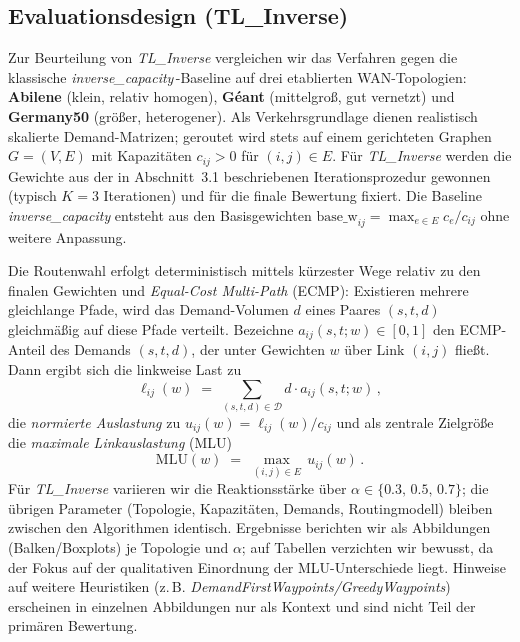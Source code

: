 \documentclass[sigconf,nonacm,review]{acmart}
\begin{document}
\subsection{Evaluationsdesign (TL\_Inverse)}
Zur Beurteilung von \textit{TL\_Inverse} vergleichen wir das Verfahren gegen die klassische
\emph{inverse\_capacity}\,-Baseline auf drei etablierten WAN-Topologien:
\textbf{Abilene} (klein, relativ homogen), \textbf{Géant} (mittelgroß, gut vernetzt) und
\textbf{Germany50} (größer, heterogener). Als Verkehrsgrundlage dienen realistisch skalierte
Demand-Matrizen; geroutet wird stets auf einem gerichteten Graphen $G=(V,E)$ mit Kapazitäten
$c_{ij}>0$ für $(i,j)\in E$. Für \textit{TL\_Inverse} werden die Gewichte aus der in
Abschnitt~3.1 beschriebenen Iterationsprozedur gewonnen (typisch $K=3$ Iterationen) und für
die finale Bewertung fixiert. Die Baseline \emph{inverse\_capacity} entsteht aus den
Basisgewichten $\mathrm{base\_w}_{ij}=\max_{e\in E}c_e/c_{ij}$ ohne weitere Anpassung.

Die Routenwahl erfolgt deterministisch mittels kürzester Wege relativ zu den finalen Gewichten
und \emph{Equal-Cost Multi-Path} (ECMP): Existieren mehrere gleichlange Pfade, wird das
Demand-Volumen $d$ eines Paares $(s,t,d)$ gleichmäßig auf diese Pfade verteilt. Bezeichne
$a_{ij}(s,t;w)\in[0,1]$ den ECMP-Anteil des Demands $(s,t,d)$, der unter Gewichten $w$ über
Link $(i,j)$ fließt. Dann ergibt sich die linkweise Last zu
\[
\ell_{ij}(w)\;=\;\sum_{(s,t,d)\in\mathcal D} d\cdot a_{ij}(s,t;w)\,,
\]
die \emph{normierte Auslastung} zu $u_{ij}(w)=\ell_{ij}(w)/c_{ij}$ und als zentrale Zielgröße
die \emph{maximale Linkauslastung} (MLU)
\[
\mathrm{MLU}(w)\;=\;\max_{(i,j)\in E}\,u_{ij}(w)\,.
\]
Für \textit{TL\_Inverse} variieren wir die Reaktionsstärke über
$\alpha\in\{0.3,\,0.5,\,0.7\}$; die übrigen Parameter (Topologie, Kapazitäten, Demands,
Routingmodell) bleiben zwischen den Algorithmen identisch. Ergebnisse berichten wir als
Abbildungen (Balken/Boxplots) je Topologie und $\alpha$; auf Tabellen verzichten wir bewusst,
da der Fokus auf der qualitativen Einordnung der MLU-Unterschiede liegt. Hinweise auf weitere
Heuristiken (z.\,B. \emph{DemandFirstWaypoints/GreedyWaypoints}) erscheinen in einzelnen
Abbildungen nur als Kontext und sind nicht Teil der primären Bewertung.
\end{document}
